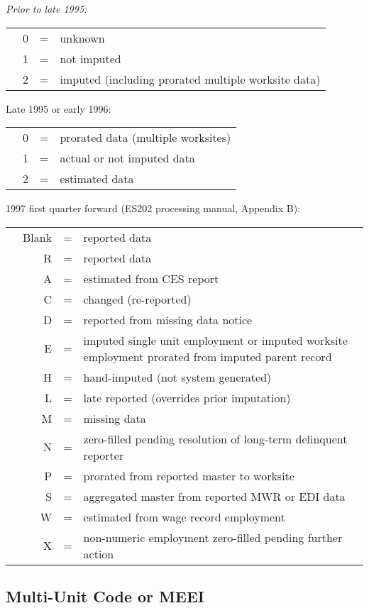 {\it 
Prior to late 1995: 

\begin{tabular}{p{1cm}rcp{10cm}}
&0&=& unknown\\
&1&=& not imputed\\
&2&=& imputed (including prorated multiple worksite data)\\
\end{tabular}





Late 1995 or early 1996:

\begin{tabular}{p{1cm}rcp{10cm}}
&0&=& prorated data (multiple worksites)\\
&1&=& actual or not imputed data\\
&2&=& estimated data\\
\end{tabular}




1997 first quarter forward (ES202 processing manual, Appendix B):

\begin{tabular}{p{1cm}rcp{10cm}}
&Blank&=& reported data\\
&R &=& reported data\\
&A &=& estimated from CES report\\
&C &=& changed (re-reported)\\
&D &=& reported from missing data notice\\
&E &=& imputed single unit employment or imputed worksite employment prorated 
from imputed parent record\\
&H &=& hand-imputed (not system generated)\\
&L &=& late reported (overrides prior imputation)\\
&M &=& missing data\\
&N &=& zero-filled pending resolution of long-term delinquent reporter\\
&P &=& prorated from reported master to worksite\\
&S &=& aggregated master from reported MWR or EDI data \\
&W &=& estimated from wage record employment\\
&X &=& non-numeric employment zero-filled pending further action\\
\end{tabular}

}


\subsection{Multi-Unit Code or MEEI}





